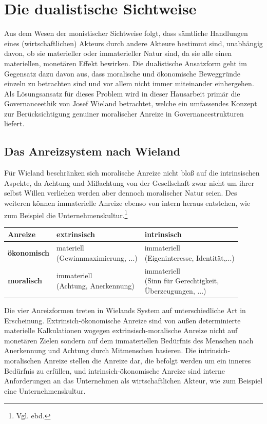 \documentclass[12pt]{article}
\begin{document}
\section{Die dualistische Sichtweise}
Aus dem Wesen der monistischer Sichtweise folgt, dass sämtliche Handlungen eines (wirtschaftlichen) Akteurs durch andere Akteure bestimmt sind, unabhängig davon, ob sie materieller oder immaterieller Natur sind, da sie alle einen materiellen, monetären Effekt bewirken. Die dualistische Ansatzform geht im Gegensatz dazu davon aus, dass moralische und ökonomische Beweggründe einzeln zu betrachten sind und vor allem nicht immer miteinander einhergehen. Als Lösungsansatz für dieses Problem wird in dieser Hausarbeit primär die Governanceethik von Josef Wieland betrachtet, welche ein umfassendes Konzept zur Berücksichtigung genuiner moralischer Anreize in Governancestrukturen liefert.
\subsection{Das Anreizsystem nach Wieland}
Für Wieland beschränken sich moralische Anreize nicht bloß auf die intrinsischen Aspekte, da Achtung und Mißachtung von der Gesellschaft zwar nicht um ihrer selbst Willen verliehen werden aber dennoch moralischer Natur seien. Des weiteren können immaterielle Anreize ebenso von intern heraus entstehen, wie zum Beispiel die Unternehmenskultur.\footnote{Vgl. ebd.}
\begin{center}
\begin{tabular}{|p{3cm}|p{5cm}|p{5cm}|}
\hline
Anreize & \textbf{extrinsisch} & \textbf{intrinsisch}\\\hline
\textbf{ökonomisch} & \makecell[lt]{materiell\\(Gewinnmaximierung, ...)} & \makecell[lt]{immateriell\\ (Eigeninteresse, Identität,...)}\\\hline
\textbf{moralisch} & \makecell[lt]{immateriell\\(Achtung, Anerkennung)} & \makecell[lt]{immateriell\\(Sinn für Gerechtigkeit,\\Überzeugungen, ...)}\\\hline
\end{tabular}
\end{center}
Die vier Anreizformen treten in Wielands System auf unterschiedliche Art in Erscheinung. Extrinsich-ökonomische Anreize sind von außen determinierte materielle Kalkulationen wogegen extrinsisch-moralische Anreize nicht auf monetären Zielen sondern auf dem immateriellen Bedürfnis des Menschen nach Anerkennung und Achtung durch Mitmenschen basieren. Die intrinsich-moralischen Anreize stellen die Anreize dar, die befolgt werden um ein inneres Bedürfnis zu erfüllen, und intrinsich-ökonomische Anreize sind interne Anforderungen an das Unternehmen als wirtschaftlichen Akteur, wie zum Beispiel eine Unternehmenskultur.
\end{document}
